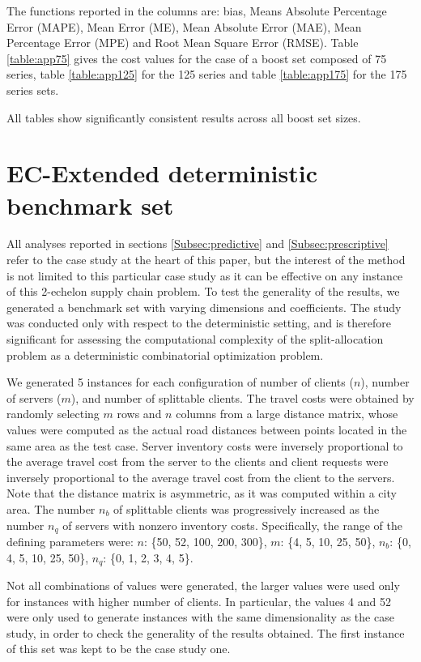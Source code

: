 \documentclass[ijoc,nonblindrev]{informs4}
\begin{document}
\begin{APPENDICES}
	The functions reported in the columns are: bias, Means Absolute Percentage Error (MAPE), Mean Error (ME), Mean Absolute Error (MAE), Mean Percentage Error (MPE) and Root Mean Square Error (RMSE). Table \ref{table:app75} gives the cost values for the case of a boost set composed of 75 series, table \ref{table:app125} for the 125 series and table \ref{table:app175} for the 175 series sets.
	
	All tables show significantly consistent results across all boost set sizes.
	
	\section{EC-Extended deterministic benchmark set} \label{app:artificial}
	
	All analyses reported in sections \ref{Subsec:predictive} and \ref{Subsec:prescriptive} refer to the case study at the heart of this paper, but the interest of the method is not limited to this particular case study as it can be effective on any instance of this 2-echelon supply chain problem. To test the generality of the results, we generated a benchmark set with varying dimensions and coefficients. The study was conducted only with respect to the deterministic setting, and is therefore significant for assessing the computational complexity of the split-allocation problem as a deterministic combinatorial optimization problem.
	
	We generated 5 instances for each configuration of number of clients ($n$), number of servers ($m$), and number of splittable clients. The travel costs were obtained by randomly selecting $m$ rows and $n$ columns from a large distance matrix, whose values were computed as the actual road distances between points located in the same area as the test case. Server inventory costs were inversely proportional to the average travel cost from the server to the clients and client requests were inversely proportional to the average travel cost from the client to the servers. Note that the distance matrix is asymmetric, as it was computed within a city area. The number $n_b$ of splittable clients was progressively increased as the number $n_q$ of servers with nonzero inventory costs. Specifically, the range of the defining parameters were: $n$: \{50, 52, 100, 200, 300\}, $m$: \{4, 5, 10, 25, 50\}, $n_b$: \{0, 4, 5, 10, 25, 50\}, $n_q$: \{0, 1, 2, 3, 4, 5\}.
	
	Not all combinations of values were generated, the larger values were used only for instances with higher number of clients. In particular, the values 4 and 52 were only used to generate instances with the same dimensionality as the case study, in order to check the generality of the results obtained. The first instance of this set was kept to be the case study one.
	

\end{APPENDICES}
\end{document}
